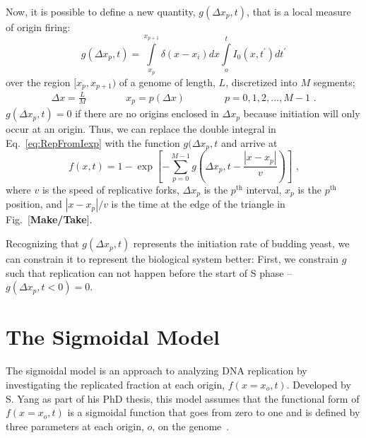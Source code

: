 		Now, it is possible to define a new quantity, $g(\Delta x_p,t)$, that is a local measure of origin firing:
		\begin{equation} \label{eq:LocalOriginFiring}
			g\left(\Delta x_p,t\right) = \int\limits_{x_p}^{x_{p+1}}\delta\left( x-x_i\right) dx \int\limits_o^t I_0\left( x,t^\prime\right) dt^\prime
		\end{equation}
		over the region $[x_p, x_{p+1})$ of a genome of length, $L$, discretized into $M$ segments;
		\begin{align}
			\Delta x = \frac{L}{M} \qquad\qquad x_p = p\left(\Delta x\right) \qquad\qquad p = 0, 1, 2, \ldots , M-1 \text{ .}
		\end{align}
		$g(\Delta x_p,t)=0$ if there are no origins enclosed in $\Delta x_p$ because initiation will only occur at an origin.
		Thus, we can replace the double integral in Eq.~\ref{eq:RepFromIexp} with the function $g(\Delta x_p,t$ and arrive at
		\begin{equation} \label{eq:RepFromG}
			f\left( x,t\right) = 1 - \exp\left[ - \sum\limits_{p=0}^{M-1}g\left(\Delta x_p,t-\frac{\left| x-x_p \right|}{v}\right)\right] \text{ ,}
		\end{equation}
		where $v$ is the speed of replicative forks, $\Delta x_p$ is the $p^\text{th}$ interval, $x_p$ is the $p^\text{th}$ position, and $\left| x-x_p \right|/v$ is the time at the edge of the triangle in Fig.~[\textbf{Make/Take}].
		
		Recognizing that $g(\Delta x_p,t)$ represents the initiation rate of budding yeast, we can constrain it to represent the biological system better:
		First, we constrain $g$ such that replication can not happen before the start of S phase -- $g(\Delta x_p,t<0)=0$. 


	\section{The Sigmoidal Model}
	\label{sec:SigmoidalModel}
	
	The sigmoidal model is an approach to analyzing DNA replication by investigating the replicated fraction at each origin, $f(x=x_o,t)$.
	Developed by S. Yang as part of his PhD thesis, this model assumes that the functional form of $f(x=x_o,t)$ is a sigmoidal function that goes from zero to one and is defined by three parameters at each origin, $o$, on the genome~\cite{ScottsPaper,ScottsThesis}.
	
